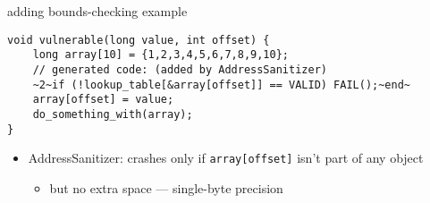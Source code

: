 
\begin{frame}[fragile,label=asanVBounds]{adding bounds-checking example}
\begin{lstlisting}
void vulnerable(long value, int offset) {
    long array[10] = {1,2,3,4,5,6,7,8,9,10};
    // generated code: (added by AddressSanitizer)
    ~2~if (!lookup_table[&array[offset]] == VALID) FAIL();~end~
    array[offset] = value;
    do_something_with(array);
}
\end{lstlisting}
    \begin{itemize}
        \item AddressSanitizer: crashes only if \lstinline|array[offset]| isn't part of any object
            \begin{itemize}
            \item but no extra space --- single-byte precision
            \end{itemize}
    \end{itemize}
\end{frame}


